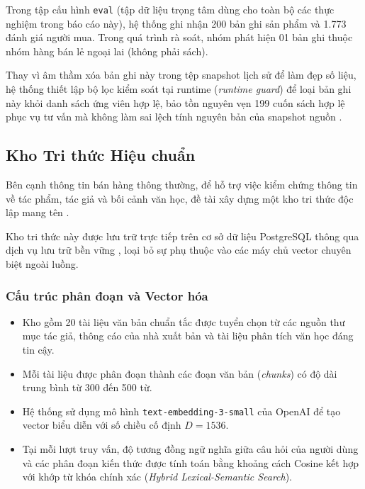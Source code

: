 Trong tập cấu hình \texttt{eval} (tập dữ liệu trọng tâm dùng cho toàn bộ các thực nghiệm trong báo cáo này), hệ thống ghi nhận 200 bản ghi sản phẩm và 1.773 đánh giá người mua. Trong quá trình rà soát, nhóm phát hiện 01 bản ghi thuộc nhóm hàng bán lẻ ngoại lai (không phải sách). 

Thay vì âm thầm xóa bản ghi này trong tệp snapshot lịch sử để làm đẹp số liệu, hệ thống thiết lập bộ lọc kiểm soát tại runtime (\textit{runtime guard}) để loại bản ghi này khỏi danh sách ứng viên hợp lệ, bảo tồn nguyên vẹn 199 cuốn sách hợp lệ phục vụ tư vấn mà không làm sai lệch tính nguyên bản của snapshot nguồn .

\subsection{Kho Tri thức Hiệu chuẩn}
Bên cạnh thông tin bán hàng thông thường, để hỗ trợ việc kiểm chứng thông tin về tác phẩm, tác giả và bối cảnh văn học, đề tài xây dựng một kho tri thức độc lập mang tên  . 

Kho tri thức này được lưu trữ trực tiếp trên cơ sở dữ liệu PostgreSQL thông qua dịch vụ lưu trữ bền vững , loại bỏ sự phụ thuộc vào các máy chủ vector chuyên biệt ngoài luồng.

\subsubsection{Cấu trúc phân đoạn và Vector hóa}
\begin{itemize}
    \item Kho gồm 20 tài liệu văn bản chuẩn tắc được tuyển chọn từ các nguồn thư mục tác giả, thông cáo của nhà xuất bản và tài liệu phân tích văn học đáng tin cậy.
    \item Mỗi tài liệu được phân đoạn thành các đoạn văn bản (\textit{chunks}) có độ dài trung bình từ 300 đến 500 từ.
    \item Hệ thống sử dụng mô hình \texttt{text-embedding-3-small} của OpenAI để tạo vector biểu diễn với số chiều cố định $D = 1536$.
    \item Tại mỗi lượt truy vấn, độ tương đồng ngữ nghĩa giữa câu hỏi của người dùng và các phân đoạn kiến thức được tính toán bằng khoảng cách Cosine kết hợp với khớp từ khóa chính xác (\textit{Hybrid Lexical-Semantic Search}).
\end{itemize}

